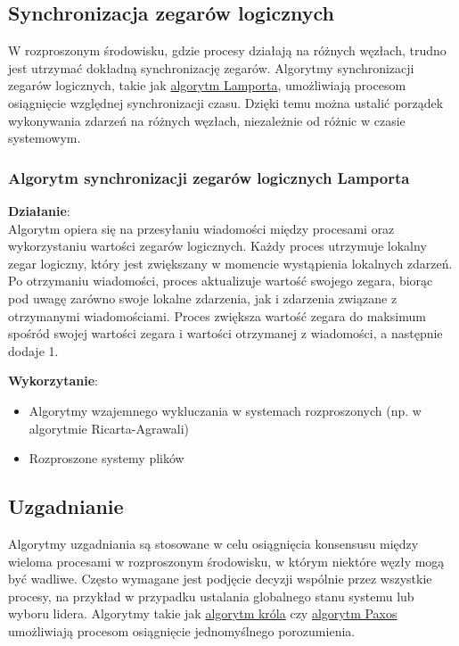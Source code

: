 \subsection{Synchronizacja zegarów logicznych}
W rozproszonym środowisku, gdzie procesy działają na różnych węzłach, trudno jest utrzymać dokładną synchronizację zegarów. Algorytmy synchronizacji zegarów logicznych, takie jak \href{https://en.wikipedia.org/wiki/Lamport_timestamp}{algorytm Lamporta}, umożliwiają procesom osiągnięcie względnej synchronizacji czasu. Dzięki temu można ustalić porządek wykonywania zdarzeń na różnych węzłach, niezależnie od różnic w czasie systemowym.

\subsubsection{Algorytm synchronizacji zegarów logicznych Lamporta}
\textbf{Działanie}:\\

Algorytm opiera się na przesyłaniu wiadomości między procesami oraz wykorzystaniu wartości zegarów logicznych. Każdy proces utrzymuje lokalny zegar logiczny, który jest zwiększany w momencie wystąpienia lokalnych zdarzeń. Po otrzymaniu wiadomości, proces aktualizuje wartość swojego zegara, biorąc pod uwagę zarówno swoje lokalne zdarzenia, jak i zdarzenia związane z otrzymanymi wiadomościami. Proces zwiększa wartość zegara do maksimum spośród swojej wartości zegara i wartości otrzymanej z wiadomości, a następnie dodaje 1.

\textbf{Wykorzytanie}:
\begin{itemize}
    \item Algorytmy wzajemnego wykluczania w systemach rozproszonych (np. w algorytmie Ricarta-Agrawali)
    \item Rozproszone systemy plików
\end{itemize}

\subsection{Uzgadnianie}
Algorytmy uzgadniania są stosowane w celu osiągnięcia konsensusu między wieloma procesami w rozproszonym środowisku, w którym niektóre węzły mogą być wadliwe. Często wymagane jest podjęcie decyzji wspólnie przez wszystkie procesy, na przykład w przypadku ustalania globalnego stanu systemu lub wyboru lidera. Algorytmy takie jak \href{https://www.isical.ac.in/~ansuman/dist_sys/PhaseKing.pdf}{algorytm króla} czy \href{https://en.wikipedia.org/wiki/Paxos_(computer_science)}{algorytm Paxos} umożliwiają procesom osiągnięcie jednomyślnego porozumienia.

